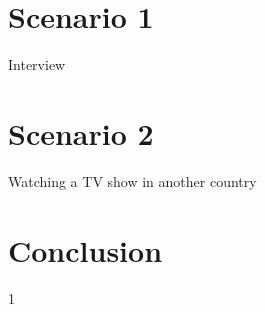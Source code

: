 \documentclass[100pt]{article}
\begin{document}


\section{Scenario 1}
\label{Scenario 1}
Interview 

\section{Scenario 2}
\label{Scenario 2}
Watching a TV show in another country

\section{Conclusion}


\pagebreak

\begin{thebibliography} {1}

\end{thebibliography}
\end{document}
